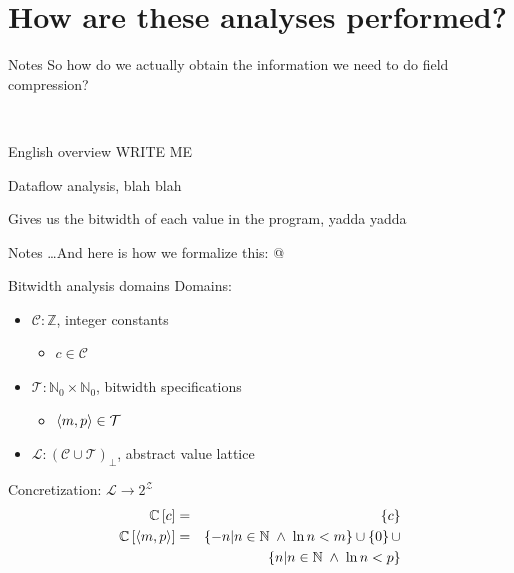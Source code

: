 \documentclass[%
pdf,
colorBG,
slideColor,
nototal,
oqe
]{prosper}
\renewcommand{\yellow}{\colC}
\newenvironment{talknotes}{\begin{slide}{Notes}\tiny}{\end{slide}}
\begin{document}
\part{How are these analyses performed?}
\begin{talknotes}
So how do we actually obtain the information we need to do field
compression?

~%
\end{talknotes}

\begin{slide}{English overview}
WRITE ME

Dataflow analysis, blah blah

Gives us the bitwidth of each value in the program, yadda yadda

\end{slide}

\begin{talknotes}
\ldots And here is how we formalize this: @
\end{talknotes}

\begin{slide}{Bitwidth analysis domains}
{\yellow Domains:}
\begin{itemize}
\item $\mathcal{C}:\mathbb{Z}$, integer constants
\begin{itemize}\yellow
\item $c\in\mathcal{C}$
\end{itemize}
\item $\mathcal{T}:\mathbb{N}_0\times\mathbb{N}_0$, bitwidth specifications
\begin{itemize}\yellow
\item $\left\langle m,p \right\rangle\in\mathcal{T}$
\end{itemize}
\item $\mathcal{L}:\left(\mathcal{C}\cup\mathcal{T}\right)_\bot$, abstract value lattice
\end{itemize}
{\yellow Concretization: $\mathcal{L}\to 2^\mathcal{Z}$}
\begin{eqnarray*}
\mathbb{C}\left[c\right] &=& \left\{ c \right\} \\
\mathbb{C}\left[\left\langle m,p \right\rangle\right] &=&
   \left\{ -n | n\in\mathbb{N} \;\wedge\; \ln n < m\right\} \cup
   \left\{0\right\} \cup\\
&& \mspace{14mu}\left\{  n | n\in\mathbb{N} \;\wedge\; \ln n < p\right\}\\
\end{eqnarray*}
\end{slide}
\end{document}
